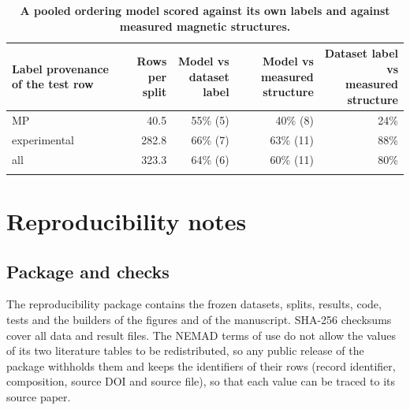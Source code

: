 \documentclass[pdflatex,sn-nature]{sn-jnl}
\makeatletter
\newcommand{\hd}[1]{\begin{tabular}[b]{@{}c@{}}#1\end{tabular}}
\makeatother
\begin{document}
\begin{table}[!ht]
\caption{\textbf{A pooled ordering model scored against its own labels and against measured magnetic structures.}}\label{tab:s29}%
\setlength{\tabcolsep}{3pt}%
\begin{tabular*}{\textwidth}{@{\extracolsep\fill}lrrrr@{}}
\toprule
Label provenance of the test row & \hd{Rows\\per split} & \hd{Model vs\\dataset label} & \hd{Model vs\\measured structure} & \hd{Dataset label vs\\measured structure} \\
\midrule
MP & 40.5 & 55\% (5) & 40\% (8) & 24\% \\
experimental & 282.8 & 66\% (7) & 63\% (11) & 88\% \\
all & 323.3 & 64\% (6) & 60\% (11) & 80\% \\
\botrule
\end{tabular*}
\end{table}


\clearpage
\section{Reproducibility notes}

\subsection{Package and checks}
The reproducibility package contains the frozen datasets, splits, results, code, tests and the builders of the figures and of the manuscript. SHA-256 checksums cover all data and result files. The NEMAD terms of use do not allow the values of its two literature tables to be redistributed, so any public release of the package withholds them and keeps the identifiers of their rows (record identifier, composition, source DOI and source file), so that each value can be traced to its source paper.
\end{document}
